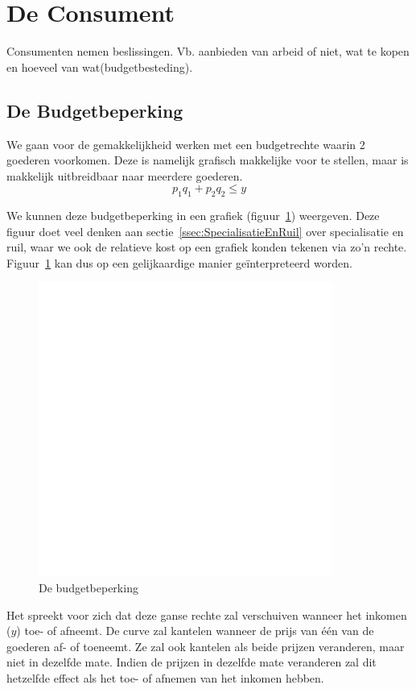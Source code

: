 \section{De Consument}

Consumenten nemen beslissingen. Vb. aanbieden van arbeid of niet, wat te kopen en hoeveel van wat(budgetbesteding).

\subsection{De Budgetbeperking}
We gaan voor de gemakkelijkheid werken met een budgetrechte waarin 2 goederen voorkomen. Deze is namelijk grafisch makkelijke voor te stellen, maar is makkelijk uitbreidbaar naar meerdere goederen.
\begin{equation}
	p_1 q_1 + p_2 q_2 \le y
\end{equation}

We kunnen deze budgetbeperking in een grafiek (figuur~\ref{fig:budgetBeperking}) weergeven. Deze figuur doet veel denken aan sectie~\ref{ssec:SpecialisatieEnRuil} over specialisatie en ruil, waar we ook de relatieve kost op een grafiek konden tekenen via zo'n rechte. Figuur~\ref{fig:budgetBeperking} kan dus op een gelijkaardige manier ge\"interpreteerd worden.

\begin{figure}[htbp]
	\centering
	\includegraphics[scale=0.4]{Images/white.png}
	\caption{De budgetbeperking}
	\label{fig:budgetBeperking}
\end{figure}

Het spreekt voor zich dat deze ganse rechte zal verschuiven wanneer het inkomen ($y$) toe- of afneemt. De curve zal kantelen wanneer de prijs van \'e\'en van de goederen af- of toeneemt. Ze zal ook kantelen als beide prijzen veranderen, maar niet in dezelfde mate. Indien de prijzen in dezelfde mate veranderen zal dit hetzelfde effect als het toe- of afnemen van het inkomen hebben.

